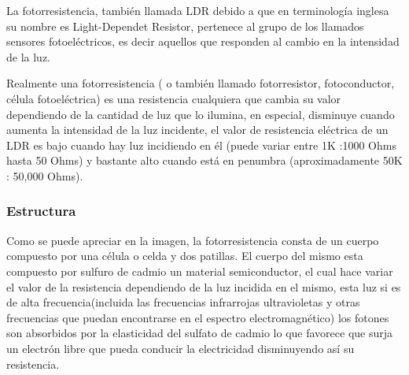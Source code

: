 \documentclass[12pt, fleqn]{article}                            %
\theoremstyle{break}                                            %
\begin{document}
        La fotorresistencia, también llamada LDR debido a que
        en terminología inglesa su nombre es Light-Dependet
        Resistor, pertenece al grupo de los llamados sensores
        fotoeléctricos, es decir aquellos que responden al cambio
        en la intensidad de la luz.

        Realmente una fotorresistencia ( o también
        llamado fotorresistor, fotoconductor, célula
        fotoeléctrica) es una resistencia cualquiera que
        cambia su valor dependiendo de la cantidad de
        luz que lo ilumina, en especial, disminuye
        cuando aumenta la intensidad de la luz
        incidente, el valor de resistencia eléctrica de un
        LDR es bajo cuando hay luz incidiendo en él
        (puede variar entre 1K :1000 Ohms hasta 50
        Ohms) y bastante alto cuando está en penumbra
        (aproximadamente 50K : 50,000 Ohms).

        \clearpage
        \subsubsection{Estructura}

            Como se puede apreciar en la imagen, la fotorresistencia consta de
            un cuerpo compuesto por una célula o celda y dos patillas. El
            cuerpo del mismo esta compuesto por sulfuro de cadmio un
            material semiconductor, el cual hace variar el valor de la
            resistencia dependiendo de la luz incidida en el mismo, esta luz si
            es de alta frecuencia(incluida las frecuencias infrarrojas
            ultravioletas y otras frecuencias que puedan encontrarse en el
            espectro electromagnético) los fotones son absorbidos por la
            elasticidad del sulfato de cadmio lo que favorece que surja un
            electrón libre que pueda conducir la electricidad disminuyendo
            así su resistencia.
\end{document}
